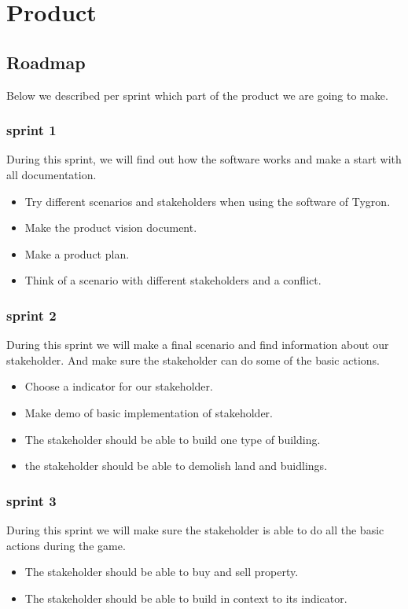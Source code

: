 \label{product}
\newpage
\section{Product}

\subsection{Roadmap}
Below we described per sprint which part of the product we are going to make. \newline

\subsubsection{sprint 1}
During this sprint, we will find out how the software works and make a start with all documentation.
\begin{itemize}
	\item Try different scenarios and stakeholders when using the software of Tygron.
	\item Make the product vision document.
	\item Make a product plan.
	\item Think of a scenario with different stakeholders and a conflict.
\end{itemize}


\subsubsection{sprint 2}
During this sprint we will make a final scenario and find information about our stakeholder. And make sure the stakeholder can do some of the basic actions.
\begin{itemize}
	\item Choose a indicator for our stakeholder.
	\item Make demo of basic implementation of stakeholder.
	\item The stakeholder should be able to build one type of building.
	\item the stakeholder should be able to demolish land and buidlings.
\end{itemize}



\subsubsection{sprint 3}
During this sprint we will make sure the stakeholder is able to do all the basic actions during the game.
\begin{itemize}
	\item The stakeholder should be able to buy and sell property.
	\item The stakeholder should be able to build in context to its indicator.
\end{itemize}


